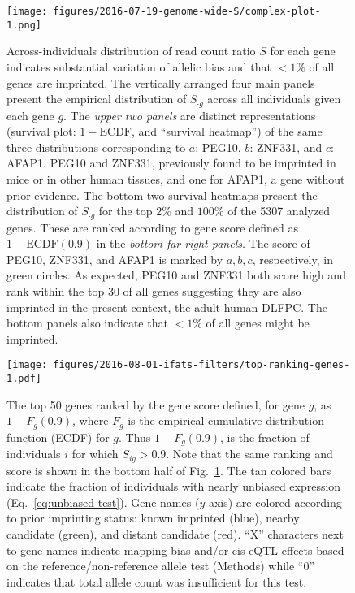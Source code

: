 \documentclass[letterpaper]{article}
\begin{document}
\begin{figure}[H]
\begin{center}
\texttt{[image: figures/2016-07-19-genome-wide-S/complex-plot-1.png]}
\end{center}
\caption{Across-individuals distribution of read count ratio \(S\) for each
gene indicates substantial variation of allelic bias and that \(<1\%\) of all
genes are imprinted.  The vertically arranged
four main panels present the empirical distribution of \(S_{\cdot g}\) across all
individuals given each gene \(g\).  The \emph{upper two panels} are distinct
representations (survival plot: \(1 - \mathrm{ECDF}\), and
``survival heatmap'') of the same three distributions corresponding to \(a\):
PEG10, \(b\): ZNF331, and \(c\): AFAP1.  PEG10 and ZNF331,
previously found to be imprinted in mice or in other human tissues, and one
for AFAP1, a gene without prior evidence.  The bottom two survival heatmaps present
the distribution of \(S_{\cdot g}\) for the top \(2\%\) and \(100\%\) of the
5307 analyzed genes.  These are ranked according to gene score defined as \(1
- \mathrm{ECDF}(0.9)\) in the \emph{bottom
far right panels}.  The score of PEG10, ZNF331, and AFAP1 is marked by
\(a,b,c\), respectively, in green circles.  As expected, PEG10 and ZNF331 both score
high and rank within the top 30 of all genes suggesting they are also imprinted in
the present context, the adult human DLFPC.  The bottom panels also indicate
that \(<1\%\) of all genes might be imprinted.
 }
\label{fig:ranking-genes}
\end{figure}

\begin{figure}[H]
\begin{center}
\texttt{[image: figures/2016-08-01-ifats-filters/top-ranking-genes-1.pdf]}
\caption{
The top 50 genes ranked by the gene score defined, for gene \(g\), as \(1 -
F_g(0.9)\), where \(F_g\) is the empirical cumulative distribution function
(ECDF) for \(g\).  Thus \(1 - F_g(0.9)\), is the fraction of individuals \(i\)
for which \(S_{ig}>0.9\).  Note that the same ranking and score is shown in
the bottom half of Fig.~\ref{fig:ranking-genes}.  The tan colored bars
indicate the fraction of individuals with nearly unbiased expression
(Eq.~\ref{eq:unbiased-test}).  Gene names (\(y\) axis) are colored according
to prior imprinting status: known imprinted (blue), nearby candidate (green),
and distant candidate (red).  ``X'' characters next to gene names indicate
mapping bias and/or cis-eQTL effects based on the reference/non-reference
allele test (Methods) while ``0'' indicates that total allele count was
insufficient for this test.
}
\label{fig:top-genes}
\end{center}
\end{figure}
\end{document}
